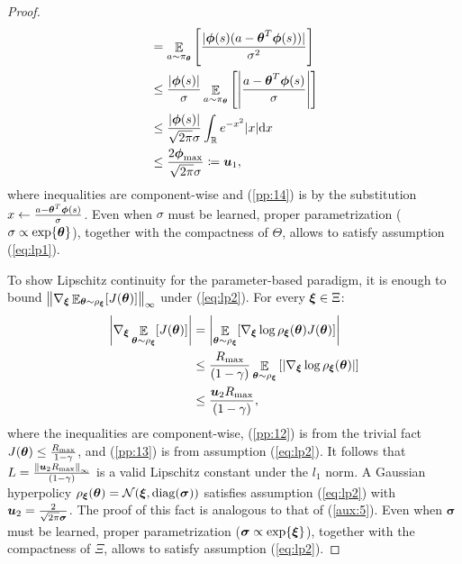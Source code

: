 \documentclass{article}
\begin{document}
\begin{proof}
\begin{align}
		&=\Exp_{a\sim\pi_{\vtheta}}\left[\frac{|\vphi(s)(a-\vtheta^T\vphi(s))|}{\sigma^2}\right] \nonumber\\
		&\leq \frac{|\vphi(s)|}{\sigma}\Exp_{a\sim\pi_{\vtheta}}\left[\left|\frac{a-\vtheta^T\vphi(s)}{\sigma}\right|\right] \nonumber\\
		&\leq \frac{|\vphi(s)|}{\sqrt{2\pi}\sigma}\int_{\Reals} e^{-x^2}|x|\de x \label{pp:14}\\
		& \leq  \frac{2\vphi_{\max}}{\sqrt{2\pi}\sigma}\coloneqq \vu_1, \label{aux:5}
	\end{align}
	where inequalities are component-wise and (\ref{pp:14}) is by the substitution $x\gets \frac{a-\vtheta^T\vphi(s)}{\sigma}$. Even when $\sigma$ must be learned, proper parametrization (\eg $\sigma\propto\exp\{\vtheta\}$), together with the compactness of $\Theta$, allows to satisfy assumption (\ref{eq:lp1}).
	
	To show Lipschitz continuity for the parameter-based paradigm, it is enough to bound $\norm[\infty]{\nabla_{\vxi}\Exp_{\vtheta\sim\rho_{\vxi}}[J(\vtheta)]}$ under (\ref{eq:lp2}). For every $\vxi\in\Xi$:
	\begin{align}
		\left|\nabla_{\vxi}\Exp_{\vtheta\sim\rho_{\vxi}}[J(\vtheta)]\right| &=
		\left|\Exp_{\vtheta\sim\rho_{\vxi}}[\nabla_{\vxi}\log\rho_{\vxi}(\vtheta)J(\vtheta)]\right| \nonumber\\
		&\leq \frac{\Rmax}{(1-\gamma)}\Exp_{\vtheta\sim\rho_{\vxi}}\left[\left|\nabla_{\vxi}\log\rho_{\vxi}(\vtheta)\right|\right] \label{pp:12} \\
		&\leq \frac{\vu_2\Rmax}{(1-\gamma)} \label{pp:13},
	\end{align}
	where the inequalities are component-wise, (\ref{pp:12}) is from the trivial fact $J(\vtheta)\leq\frac{\Rmax}{1-\gamma}$, and (\ref{pp:13}) is from assumption (\ref{eq:lp2}).
	It follows that $L=\frac{\norm[\infty]{\vu_2\Rmax}}{(1-\gamma)}$ is a valid Lipschitz constant under the $l_1$ norm.
	 A Gaussian hyperpolicy $\rho_{\vxi}(\vtheta) = \mathcal{N}(\vxi,\mathrm{diag}(\boldsymbol{\sigma}))$ satisfies assumption (\ref{eq:lp2}) with $\vu_2 = \frac{2}{\sqrt{2\pi}\boldsymbol{\sigma}}$. The proof of this fact is analogous to that of (\ref{aux:5}). Even when $\boldsymbol{\sigma}$ must be learned, proper parametrization (\eg $\boldsymbol{\sigma}\propto\exp\{\vxi\}$), together with the compactness of $\Xi$, allows to satisfy assumption (\ref{eq:lp2}).
\end{proof}
\end{document}
